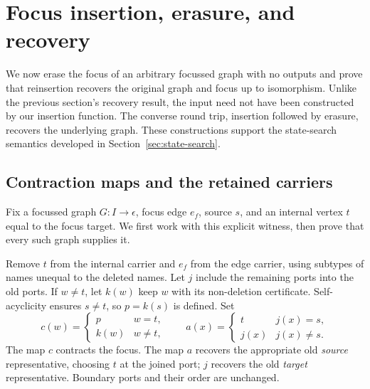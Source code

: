 \section{Focus insertion, erasure, and recovery}
\label{sec:erasure}

We now erase the focus of an arbitrary focussed graph with no outputs and
prove that reinsertion recovers the original graph and focus up to isomorphism.
Unlike the previous section's recovery result, the input need not have been
constructed by our insertion function. The converse round trip, insertion
followed by erasure, recovers the underlying graph. These constructions
support the state-search semantics developed in Section~\ref{sec:state-search}.

\subsection{Contraction maps and the retained carriers}
Fix a focussed graph $G:I\to\epsilon$, focus edge $e_f$, source $s$, and an
internal vertex $t$ equal to the focus target. We first work with this explicit
witness, then prove that every such graph supplies it.

\begin{definition}\label{term:focus-erasure}
Remove $t$ from the internal carrier and $e_f$ from the edge carrier, using
subtypes of names unequal to the deleted names. Let $j$ include the remaining
ports into the old ports. If $w\ne t$, let $k(w)$ keep $w$ with its non-deletion
certificate. Self-acyclicity ensures $s\ne t$, so $p=k(s)$ is defined. Set
\[
 c(w)=\begin{cases}p&w=t,\\k(w)&w\ne t,\end{cases}
 \qquad
 a(x)=\begin{cases}t&j(x)=s,\\j(x)&j(x)\ne s.\end{cases}
\]
The map $c$ contracts the focus. The map $a$ recovers the appropriate old
\emph{source} representative, choosing $t$ at the joined port; $j$ recovers
the old \emph{target} representative. Boundary ports and their order are
unchanged.
\end{definition}

